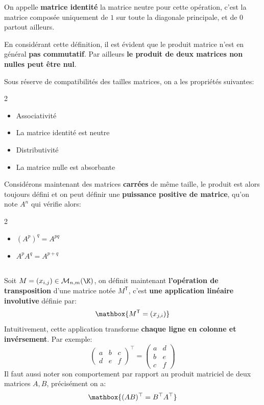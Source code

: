 On appelle \textbf{matrice identité} la matrice neutre pour cette opération, c'est la matrice composée uniquement de \(1\) sur toute la diagonale principale, et de \(0\) partout ailleurs.\<

En considérant cette définition, il est évident que le produit matrice n'est en général \textbf{pas commutatif}. Par ailleurs \textbf{le produit de deux matrices non nulles peut être nul}.
\pagebreak

Sous réserve de compatibilités des tailles matrices, on a les propriétés suivantes:
\begin{multicols}{2}
   \begin{itemize}
      \item Associativité
      \item La matrice identité est neutre
      \item Distributivité
      \item La matrice nulle est absorbante
   \end{itemize}
\end{multicols}   

Considérons maintenant des matrices \textbf{carrées} de même taille, le produit est alors toujours défini et on peut définir une \textbf{puissance positive de matrice}, qu'on note \(A^n\) qui vérifie alors:

\begin{multicols}{2}
   \begin{itemize}
      \item \((A^p)^q = A^{pq}\)
      \item \(A^pA^q = A^{p +q}\)
   \end{itemize}
\end{multicols}    

\subsection*{}

Soit \(M = (x_{i,j})\in \mathcal{M}_{n, m}(\K)\), on définit maintenant \textbf{l'opération de transposition} d'une matrice notée \(M^\mathsf{T}\), c'est \textbf{une application linéaire involutive} définie par:
\[
   \mathbox{M^\mathsf{T} = (x_{j,i})}   
\]
Intuitivement, cette application transforme \textbf{chaque ligne en colonne et invérsement}. Par exemple:
\[
   \begin{pmatrix}
      a & b & c\\
      d & e & f
   \end{pmatrix}^\top = 
   \begin{pmatrix}
      a & d\\
      b & e\\
      c & f
   \end{pmatrix}
\]
Il faut aussi noter son comportement par rapport au produit matriciel de deux matrices \(A, B\), précisément on a:
\[
   \mathbox{
      (AB)^\top = B^\top A^\top
   }
\]

